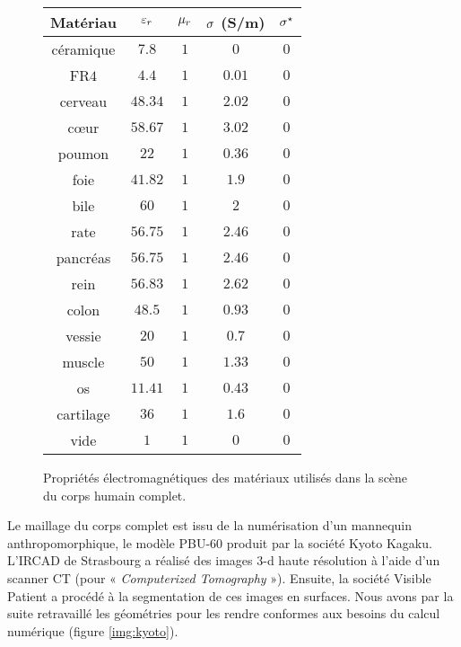 \begin{figure}[!h]
	\begin{center}
		\caption{
			\label{tab:proprietes_mat_corps}
			Propriétés électromagnétiques des matériaux utilisés
			dans la scène du corps humain complet.
		}
		
		\begin{tabular}{|c|c|c|c|c|}
			\hline
			Matériau & $\varepsilon_r$ & $\mu_r$ & $\sigma$ (S/m) & $\sigma^\star$ \\ \hline\hline
			céramique & $7.8$ & $1$ & $0$ & $0$ \\	\hline
			FR$4$ & $4.4$ & $1$ & $0.01$ & $0$ \\	\hline
			cerveau & $48.34$ & $1$ & $2.02$ & $0$ \\	\hline
			cœur & $58.67$ & $1$ & $3.02$ & $0$ \\	\hline
			poumon & $22$ & $1$ & $0.36$ & $0$ \\	\hline
			foie & $41.82$ & $1$ & $1.9$ & $0$ \\	\hline
			bile & $60$ & $1$ & $2$ & $0$ \\	\hline
			rate & $56.75$ & $1$ & $2.46$ & $0$ \\	\hline
			pancréas & $56.75$ & $1$ & $2.46$ & $0$ \\	\hline
			rein & $56.83$ & $1$ & $2.62$ & $0$ \\	\hline
			colon & $48.5$ & $1$ & $0.93$ & $0$ \\	\hline
			vessie & $20$ & $1$ & $0.7$ & $0$ \\	\hline
			muscle & $50$ & $1$ & $1.33$ & $0$ \\	\hline
			os & $11.41$ & $1$ & $0.43$ & $0$ \\	\hline
			cartilage & $36$ & $1$ & $1.6$ & $0$ \\	\hline
			vide & $1$ & $1$ & $0$ & $0$ \\	\hline
		\end{tabular}
	\end{center}
\end{figure}


Le maillage du corps complet est issu de la numérisation d'un mannequin
anthropomorphique, le modèle PBU-60 produit par la société Kyoto Kagaku.
L'IRCAD de Strasbourg a réalisé des images $3$-d haute résolution à l’aide d’un
scanner CT (pour « \textit{Computerized Tomography} »).
Ensuite, la société Visible Patient a procédé à la segmentation de ces images
en surfaces. Nous avons par la suite
retravaillé les géométries pour les rendre conformes aux
besoins du calcul numérique (figure \ref{img:kyoto}).


